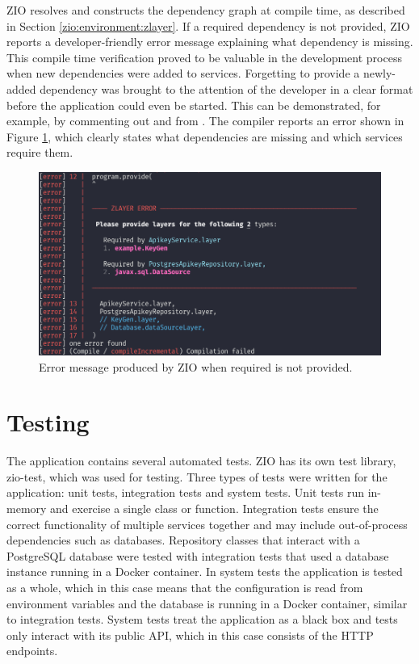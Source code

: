 ZIO resolves and constructs the dependency graph at compile time, as described in Section \ref{zio:environment:zlayer}. If a required dependency is not provided, ZIO reports a developer-friendly error message explaining what dependency is missing. This compile time verification proved to be valuable in the development process when new dependencies were added to services. Forgetting to provide a newly-added dependency was brought to the attention of the developer in a clear format before the application could even be started. This can be demonstrated, for example, by commenting out  and  from . The compiler reports an error shown in Figure \ref{fig:zlayer-provide-error}, which clearly states what dependencies are missing and which services require them.



\begin{figure}[ht!]
    \centering
    \includegraphics[width=\textwidth]{images/zlayer-provide-error.png}
    \caption{Error message produced by ZIO when required  is not provided.}
    \label{fig:zlayer-provide-error}
\end{figure}


\section{Testing}
The application contains several automated tests. ZIO has its own test library, zio-test, which was used for testing. Three types of tests were written for the application: unit tests, integration tests and system tests. Unit tests run in-memory and exercise a single class or function. Integration tests ensure the correct functionality of multiple services together and may include out-of-process dependencies such as databases. Repository classes that interact with a PostgreSQL database were tested with integration tests that used a database instance running in a Docker container. In system tests the application is tested as a whole, which in this case means that the configuration is read from environment variables and the database is running in a Docker container, similar to integration tests. System tests treat the application as a black box and tests only interact with its public API, which in this case consists of the HTTP endpoints.

